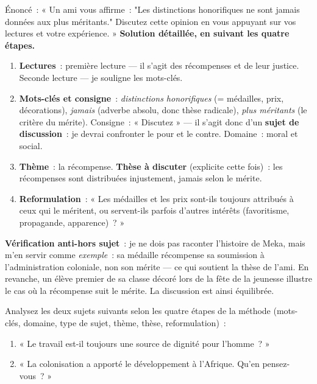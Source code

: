 \documentclass[11pt]{article}
\begin{document}
\begin{exoresolu}
Énoncé~: « Un ami vous affirme~: "Les distinctions honorifiques ne sont jamais données aux plus méritants." Discutez cette opinion en vous appuyant sur vos lectures et votre expérience. »
\tcblower
\textbf{Solution détaillée, en suivant les quatre étapes.}
\begin{enumerate}
\item \textbf{Lectures}~: première lecture — il s'agit des récompenses et de leur justice. Seconde lecture — je souligne les mots-clés.
\item \textbf{Mots-clés et consigne}~: \emph{distinctions honorifiques} (= médailles, prix, décorations), \emph{jamais} (adverbe absolu, donc thèse radicale), \emph{plus méritants} (le critère du mérite). Consigne~: « Discutez » — il s'agit donc d'un \textbf{sujet de discussion}~: je devrai confronter le pour et le contre. Domaine~: moral et social.
\item \textbf{Thème}~: la récompense. \textbf{Thèse à discuter} (explicite cette fois)~: les récompenses sont distribuées injustement, jamais selon le mérite.
\item \textbf{Reformulation}~: « Les médailles et les prix sont-ils toujours attribués à ceux qui le méritent, ou servent-ils parfois d'autres intérêts (favoritisme, propagande, apparence)~? »
\end{enumerate}
\textbf{Vérification anti-hors sujet}~: je ne dois pas raconter l'histoire de Meka, mais m'en servir comme \emph{exemple}~: sa médaille récompense sa soumission à l'administration coloniale, non son mérite — ce qui soutient la thèse de l'ami. En revanche, un élève premier de sa classe décoré lors de la fête de la jeunesse illustre le cas où la récompense suit le mérite. La discussion est ainsi équilibrée.
\end{exoresolu}

\begin{exercice}
Analysez les deux sujets suivants selon les quatre étapes de la méthode (mots-clés, domaine, type de sujet, thème, thèse, reformulation)~:
\begin{enumerate}
\item « Le travail est-il toujours une source de dignité pour l'homme~? »
\item « La colonisation a apporté le développement à l'Afrique. Qu'en pensez-vous~? »
\end{enumerate}
\end{exercice}
\end{document}
